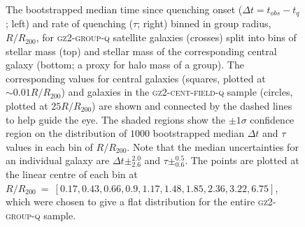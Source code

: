 \documentclass[useAMS,usenatbib]{mn2e}
\begin{document}
\begin{figure}
{\caption[Trend of $\Delta t$ and $\tau$ with group radius split by stellar mass and halo mass]{The bootstrapped median time since quenching onset ($\Delta t = t_{obs} - t_{q}$; left) and rate of quenching ($\tau$; right) binned in group radius, $R/R_{200}$, for \textsc{gz2-group-q} satellite galaxies (crosses) split into bins of stellar mass (top) and stellar mass of the corresponding central galaxy (bottom; a proxy for halo mass of a group). The corresponding values for central galaxies (squares, plotted at $\sim0.01 R/R_{200}$) and galaxies in the \textsc{gz2-cent-field-q} sample (circles, plotted at $25 R/R_{200}$) are shown and connected by the dashed lines to help guide the eye. The shaded regions show the $\pm1\sigma$ confidence region on the distribution of $1000$ bootstrapped median $\Delta t$ and $\tau$ values in each bin of $R/R_{200}$. Note that the median uncertainties for an individual galaxy are $\Delta t\pm_{2.6}^{2.0}$ and $\tau\pm_{0.6}^{0.5}$. The points are plotted at the linear centre of each bin at $R/R_{200}~=~ [0.17,  0.43,  0.66,  0.9 ,  1.17,  1.48,  1.85,  2.36,  3.22,  6.75]$, which were chosen to give a flat distribution for the entire \textsc{gz2-group-q} sample.}
\label{fig:timesinceradius}}
\end{figure}
\end{document}
